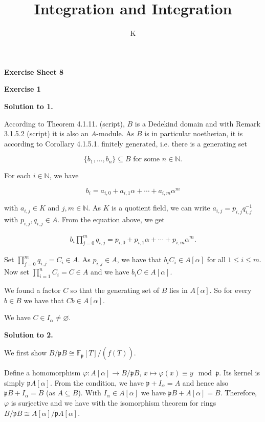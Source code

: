 \documentclass[a4paper]{article}
\title{Integration and Integration}
\author{K}
\theoremstyle{definition}
\begin{document}
\begin{center}
    \noindent\textbf{Exercise Sheet 8}
\end{center}
\noindent\textbf{Exercise 1}

\noindent\textbf{Solution to 1.}

\noindent According to Theorem 4.1.11. (script), \(B\) is a Dedekind domain and with Remark 3.1.5.2 (script) it is also an \(A\)-module. As \(B\) is in particular noetherian, it is according to Corollary 4.1.5.1. finitely generated, i.e. there is a generating set

\begin{equation}
    \{b_1, \ldots, b_n\} \subseteq B \text{ for some \(n \in \mathbb{N}\).}
\end{equation}

\noindent For each \(i \in \mathbb{N}\), we have

\begin{equation}
    b_i = a_{i, 0} + a_{i, 1} \alpha + \cdots + a_{i, m} \alpha^m
\end{equation}

\noindent with \(a_{i, j} \in K\) and \(j, m \in \mathbb{N}\). As \(K\) is a quotient field, we can write \(a_{i,j} = p_{i,j}q_{i,j}^{-1}\) with \(p_{i,j}, q_{i,j} \in A\). From the equation above, we get

\begin{align}
    b_i \prod_{j = 0}^m q_{i, j} = p_{i, 0} + p_{i, 1} \alpha + \cdots + p_{i, m} \alpha^m \text{.}
\end{align}

\noindent Set \(\prod_{j=0}^m q_{i,j} = C_i \in A\). As \(p_{i, j} \in A\), we have that \(b_i C_i \in A[\alpha]\) for all \(1 \leq i \leq m\). Now set \(\prod_{i=1}^n C_i = C \in A\) and we have \(b_i C \in A[\alpha]\).

We found a factor \(C\) so that the generating set of \(B\) lies in \(A[\alpha]\). So for every \(b \in B\) we have that \(Cb \in A[\alpha]\).

We have \(C \in I_\alpha \neq \varnothing\).

\bigskip

\noindent\textbf{Solution to 2.}

\noindent We first show \(B / \mathfrak{p} B \cong \mathbb{F}_{\mathfrak{p}}[T] / (\overline{f(T)})\).

\bigskip

Define a homomorphism \(\varphi: A[\alpha] \rightarrow B / \mathfrak{p}B\), \(x \mapsto \varphi(x) \equiv y \mod{\mathfrak{p}}\). Its kernel is simply \(\mathfrak{p}A[\alpha]\). From the condition, we have \(\mathfrak{p} + I_\alpha = A\) and hence also \(\mathfrak{p}B + I_\alpha = B\) (as \(A \subseteq B\)). With \(I_\alpha \in A[\alpha]\) we have \(\mathfrak{p}B + A[\alpha] = B\). Therefore, \(\varphi\) is surjective and we have with the isomorphism theorem for rings \(B / \mathfrak{p}B \cong A[\alpha] / \mathfrak{p}A[\alpha]\).
\end{document}
